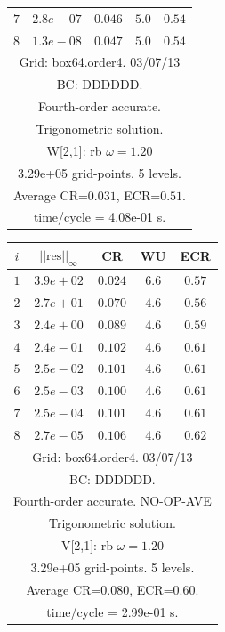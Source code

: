 \begin{table}[hbt]
\begin{center}
\begin{tabular}{|c|c|c|c|c|}
 $ 7$  & $ 2.8e-07$ & $0.046$ & $ 5.0$ & $0.54$ \\ 
 $ 8$  & $ 1.3e-08$ & $0.047$ & $ 5.0$ & $0.54$ \\ 
\hline 
\multicolumn{5}{|c|}{Grid: box64.order4. 03/07/13}  \\
\multicolumn{5}{|c|}{BC: DDDDDD.}  \\
\multicolumn{5}{|c|}{Fourth-order accurate.}  \\
\multicolumn{5}{|c|}{Trigonometric solution.}  \\
\multicolumn{5}{|c|}{W[2,1]: rb $\omega=1.20$}  \\
\multicolumn{5}{|c|}{3.29e+05 grid-points. 5 levels.}  \\
\multicolumn{5}{|c|}{Average CR=$0.031$, ECR=$0.51$.}  \\
\multicolumn{5}{|c|}{time/cycle = 4.08e-01 s.}  \\
\hline 
\end{tabular}
\begin{tabular}{|c|c|c|c|c|} \hline 
 $i$   & $\vert\vert\mbox{res}\vert\vert_\infty$  &  CR     &  WU    & ECR  \\   \hline 
 $ 1$  & $ 3.9e+02$ & $0.024$ & $ 6.6$ & $0.57$ \\ 
 $ 2$  & $ 2.7e+01$ & $0.070$ & $ 4.6$ & $0.56$ \\ 
 $ 3$  & $ 2.4e+00$ & $0.089$ & $ 4.6$ & $0.59$ \\ 
 $ 4$  & $ 2.4e-01$ & $0.102$ & $ 4.6$ & $0.61$ \\ 
 $ 5$  & $ 2.5e-02$ & $0.101$ & $ 4.6$ & $0.61$ \\ 
 $ 6$  & $ 2.5e-03$ & $0.100$ & $ 4.6$ & $0.61$ \\ 
 $ 7$  & $ 2.5e-04$ & $0.101$ & $ 4.6$ & $0.61$ \\ 
 $ 8$  & $ 2.7e-05$ & $0.106$ & $ 4.6$ & $0.62$ \\ 
\hline 
\multicolumn{5}{|c|}{Grid: box64.order4. 03/07/13}  \\
\multicolumn{5}{|c|}{BC: DDDDDD.}  \\
\multicolumn{5}{|c|}{Fourth-order accurate. NO-OP-AVE}  \\
\multicolumn{5}{|c|}{Trigonometric solution.}  \\
\multicolumn{5}{|c|}{V[2,1]: rb $\omega=1.20$}  \\
\multicolumn{5}{|c|}{3.29e+05 grid-points. 5 levels.}  \\
\multicolumn{5}{|c|}{Average CR=$0.080$, ECR=$0.60$.}  \\
\multicolumn{5}{|c|}{time/cycle = 2.99e-01 s.}  \\

\end{tabular}
\end{center}
\end{table}
